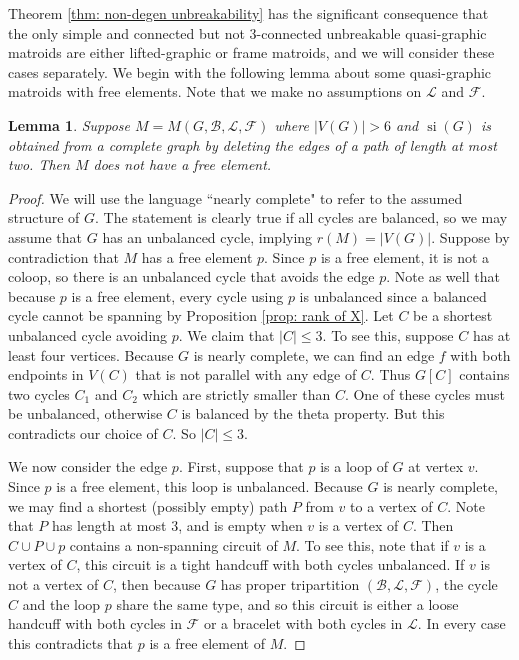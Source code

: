 \documentclass[12pt]{article}
\newtheorem{lemma}[theorem]{Lemma}
\theoremstyle{definition}
\theoremstyle{plain} %
\newcommand{\cB}{\mathcal{B}}
\newcommand{\cF}{\mathcal{F}}
\newcommand{\cL}{\mathcal{L}}
\DeclareMathOperator{\si}{si}
\newcommand{\qbg}{\ensuremath{(G,\cB,\cL,\cF)}}
\begin{document}
    
Theorem \ref{thm: non-degen unbreakability} has the significant consequence that the only simple and connected but not 3-connected unbreakable quasi-graphic matroids are either lifted-graphic or frame matroids, and we will consider these cases separately.
We begin with the following lemma about some quasi-graphic matroids with free elements. 
Note that we make no assumptions on $\cL$ and $\cF$.

\begin{lemma}\label{lem: complete graphs dont have free elements}
    Suppose $M=M\qbg$ where $\lvert V(G)\rvert>6$ and $\si(G)$ is obtained from a complete graph by deleting the edges of a path of length at most two. Then $M$ does not have a free element.
\end{lemma}
\begin{proof}
    We will use the language ``nearly complete" to refer to the assumed structure of $G$. The statement is clearly true if all cycles are balanced, so we may assume that $G$ has an unbalanced cycle, implying $r(M)=\lvert V(G)\rvert$. Suppose by contradiction that $M$ has a free element $p$. Since $p$ is a free element, it is not a coloop, so there is an unbalanced cycle that avoids the edge $p$. Note as well that because $p$ is a free element, every cycle using $p$ is unbalanced since a balanced cycle cannot be spanning by Proposition \ref{prop: rank of X}. Let $C$ be a shortest unbalanced cycle avoiding $p$. We claim that $\lvert C\rvert\leq3$. To see this, suppose $C$ has at least four vertices. Because $G$ is nearly complete, we can find an edge $f$ with both endpoints in $V(C)$ that is not parallel with any edge of $C$. Thus $G[C]$ contains two cycles $C_1$ and $C_2$ which are strictly smaller than $C$. One of these cycles must be unbalanced, otherwise $C$ is balanced by the theta property. But this contradicts our choice of $C$. So $\lvert C\rvert\leq3$.

    We now consider the edge $p$. First, suppose that $p$ is a loop of $G$ at vertex $v$. Since $p$ is a free element, this loop is unbalanced. Because $G$ is nearly complete, we may find a shortest (possibly empty) path $P$ from $v$ to a vertex of $C$. Note that $P$ has length at most 3, and is empty when $v$ is a vertex of $C$. Then $C\cup P\cup p$ contains a non-spanning circuit of $M$. To see this, note that if $v$ is a vertex of $C$, this circuit is a tight handcuff with both cycles unbalanced. If $v$ is not a vertex of $C$, then because $G$ has proper tripartition $(\cB,\cL,\cF)$, the cycle $C$ and the loop $p$ share the same type, and so this circuit is either a loose handcuff with both cycles in $\cF$ or a bracelet with both cycles in $\cL$. In every case this contradicts that $p$ is a free element of $M$.


\end{proof}
\end{document}

